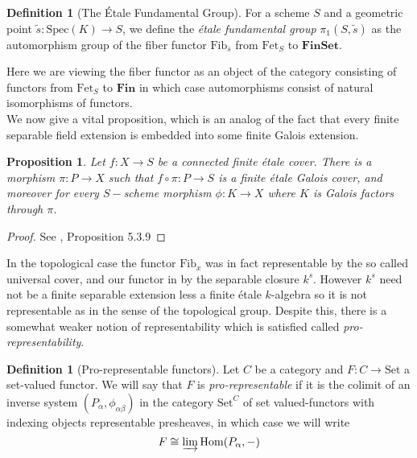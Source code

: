 \documentclass{article}
\theoremstyle{definition}
\newtheorem{definition}[theorem]{Definition}
\theoremstyle{remark}
\theoremstyle{plain}
\newtheorem{proposition}[theorem]{Proposition}
\begin{document}
\begin{definition}[The \'Etale Fundamental Group]
	For a scheme $S$ and a geometric point $\widetilde{s}: \text{Spec}(K) \to S$, we define the \textit{\'etale fundamental group} $\pi_1(S, \widetilde{s})$ as the automorphism group of the fiber functor $\text{Fib}_{\overline{s}}$ from $\text{Fet}_{S}$ to $\textbf{FinSet}$.
\end{definition}

Here we are viewing the fiber functor as an object of the category consisting of functors from $\text{Fet}_S$ to $\textbf{Fin}$ in which case automorphisms consist of natural isomorphisms of functors.\\

We now give a vital proposition, which is an analog of the fact that every finite separable field extension is embedded into some finite Galois extension.  


\begin{proposition}
	Let $f: X \to S$ be a connected finite \'etale cover. 
	There is a morphism $\pi: P \to X$ such that $f \circ \pi: P \to S$ is a finite \'etale Galois cover, and moreover for every $S-$scheme morphism $\phi:K  \to X$ where $K$ is Galois factors through $\pi$.
\end{proposition}

\begin{proof}
	See \cite{Szamuely}, Proposition 5.3.9
\end{proof}

In the topological case the functor $\text{Fib}_x$ was in fact representable by the so called universal cover, and our functor in  by the separable closure $k^s$.
However $k^s$ need not be a finite separable extension less a finite \'etale $k$-algebra so it is not representable as in the sense of the topological group.
Despite this, there is a somewhat weaker notion of representability which is satisfied called \textit{pro-representability}.

\begin{definition}[Pro-representable functors]
	Let $C$ be a category and $F: C \to \text{Set}$ a set-valued functor.
	We will say that $F$ is \textit{pro-representable} if it is the colimit of an inverse system $(P_{\alpha}, \phi_{\alpha \beta})$ in the category $\text{Set}^C$ of set valued-functors with indexing objects representable presheaves, in which case we will write 
\[F \cong \varinjlim \text{Hom}(P_{\alpha}, -)\]
\end{definition} 
\end{document}
